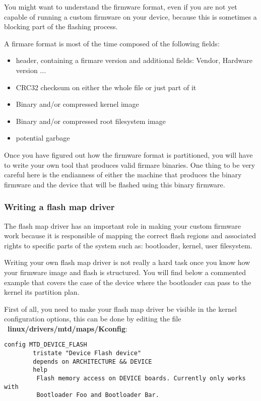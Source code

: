 You might want to understand the firmware format, even if you are not yet capable
of running a custom firmware on your device, because this is sometimes a blocking
part of the flashing process.

A firmare format is most of the time composed of the following fields:

\begin{itemize}
\item header, containing a firmare version and additional fields: Vendor, Hardware version ...
\item CRC32 checksum on either the whole file or just part of it
\item Binary and/or compressed kernel image
\item Binary and/or compressed root filesystem image
\item potential garbage
\end{itemize}

Once you have figured out how the firmware format is partitioned, you will have 
to write your own tool that produces valid firmare binaries. One thing to be very
careful here is the endianness of either the machine that produces the binary 
firmware and the device that will be flashed using this binary firmware.

\subsubsection{Writing a flash map driver}

The flash map driver has an important role in making your custom firmware work 
because it is responsible of mapping the correct flash regions and associated 
rights to specific parts of the system such as: bootloader, kernel, user filesystem.

Writing your own flash map driver is not really a hard task once you know how your
firmware image and flash is structured. You will find below a commented example
that covers the case of the device where the bootloader can pass to the kernel its partition plan.

First of all, you need to make your flash map driver be visible in the kernel 
configuration options, this can be done by editing the file \
\textbf{linux/drivers/mtd/maps/Kconfig}:

\begin{verbatim}
config MTD_DEVICE_FLASH
        tristate "Device Flash device"
        depends on ARCHITECTURE && DEVICE
        help
         Flash memory access on DEVICE boards. Currently only works with
         Bootloader Foo and Bootloader Bar.
\end{verbatim}

